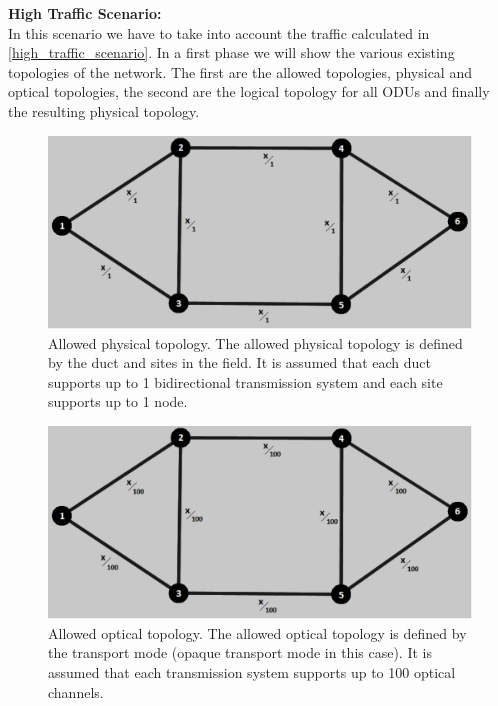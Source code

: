 \noindent
\textbf{High Traffic Scenario:}\\

In this scenario we have to take into account the traffic calculated in \ref{high_traffic_scenario}. In a first phase we will show the various existing topologies of the network. The first are the allowed topologies, physical and optical topologies, the second are the logical topology for all ODUs and finally the resulting physical topology.\\

\begin{figure}[H]
\centering
\includegraphics[width=13cm]{sdf/heuristic/opaque/figures/allowed_physical}
\caption{Allowed physical topology. The allowed physical topology is defined by the duct and sites in the field. It is assumed that each duct supports up to 1 bidirectional transmission system and each site supports up to 1 node.}
\label{allowed_physical_surv_ref_high_heuristic}
\end{figure}

\begin{figure}[H]
\centering
\includegraphics[width=13cm]{sdf/heuristic/opaque/figures/allowed_optical}
\caption{Allowed optical topology. The allowed optical topology is defined by the transport mode (opaque transport mode in this case). It is assumed that each transmission system supports up to 100 optical channels.}
\label{allowed_optical_surv_ref_high_heuristic}
\end{figure}

